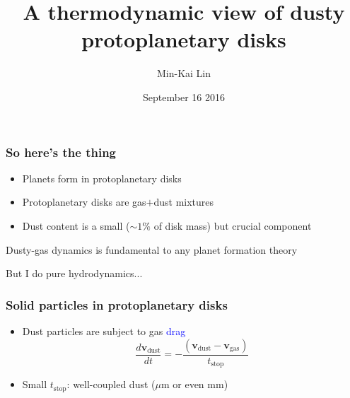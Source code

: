 \documentclass[10pt]{beamer}
\title[Dusty gas dynamics]{A thermodynamic view of dusty protoplanetary
disks}
\author[M-K. Lin]{Min-Kai Lin}
\institute[Arizona]{{\normalsize Steward Theory Fellow, N307 $\to$ Assistant
  Research Fellow, ASIAA}}
\date{September 16 2016}
\begin{document}
\begin{frame}[plain]
  \titlepage
\end{frame}
 
\begin{frame}
  \frametitle{So here's the thing}
  \begin{itemize}
  \item Planets form in protoplanetary disks 
  \item Protoplanetary disks are gas$+$dust mixtures 
  \item Dust content is a small ($\sim 1\%$ of disk mass) but crucial
    component 
  \end{itemize}

\begin{displaybox}{10cm}
  Dusty-gas dynamics is fundamental to any planet formation theory
\end{displaybox}
\vspace{3cm}
{\small But I do pure hydrodynamics...}
\end{frame}

\begin{frame}
  \frametitle{Solid particles in protoplanetary disks}
  \begin{itemize}
  \item Dust particles are subject to gas \textcolor{blue}{drag}
    \[
    \frac{d\bm{v}_\text{dust}}{d t} = -
    \frac{\left(\bm{v}_\text{dust} -
        \bm{v}_\text{gas}\right)}{t_\text{stop}} 
    \]
  \item Small $t_\text{stop}$: well-coupled dust ($\mu$m or even mm) 
  \end{itemize}
\end{frame}
\end{document}
